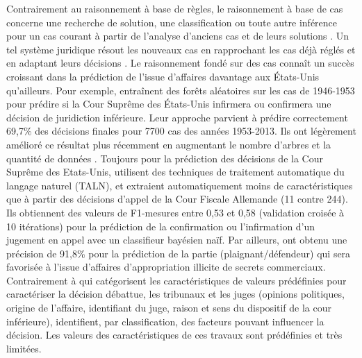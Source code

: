 Contrairement au raisonnement à base de règles, le raisonnement à base de cas concerne une recherche de solution, une classification ou toute autre inférence pour un cas courant à partir de l'analyse d'anciens cas et de leurs solutions \citep{moens2002case-basedreasoning}. Un tel système juridique résout les nouveaux cas en rapprochant les cas déjà réglés et en adaptant leurs décisions \citep{Berka2011rbr-cbr}. Le raisonnement fondé sur des cas connaît un succès croissant dans la prédiction de l'issue d'affaires davantage aux États-Unis qu'ailleurs. Pour exemple, \citet{katz2014predicting} entraînent des forêts aléatoires \citep{breiman2001randomforest} sur les cas de 1946-1953 pour prédire si la Cour Suprême des États-Unis infirmera ou confirmera une décision de juridiction inférieure. Leur approche parvient à prédire correctement 69,7\% des décisions finales pour 7700 cas des années 1953-2013. Ils ont légèrement amélioré ce résultat plus récemment en augmentant le nombre d'arbres et la quantité de données \citep{katz2017predictsupremecourt}. Toujours pour la prédiction des décisions de la Cour Suprême des Etats-Unis, \citet{waltl2017predictgermantaxlaw} utilisent des techniques de traitement automatique du langage naturel (TALN), et extraient automatiquement moins de caractéristiques que \citep{katz2014predicting}  à partir des décisions d'appel de la Cour Fiscale Allemande (11 contre 244). Ils obtiennent des valeurs de F1-mesures entre 0,53 et 0,58 (validation croisée à 10 itérations) pour la prédiction  de la confirmation ou l'infirmation d'un jugement en appel avec un classifieur bayésien naïf.  Par ailleurs, \cite{Ashley2009classifCases} ont obtenu une précision de 91,8\% pour la prédiction de la partie (plaignant/défendeur)  qui sera favorisée à l'issue d'affaires d'appropriation illicite de secrets commerciaux. Contrairement à \citep{katz2014predicting} qui catégorisent les caractéristiques de valeurs prédéfinies pour caractériser la décision débattue, les tribunaux et les juges (opinions politiques, origine de l'affaire, identifiant du juge, raison et sens du dispositif de la cour inférieure), \cite{Ashley2009classifCases} identifient, par classification, des facteurs pouvant influencer la décision. Les valeurs des caractéristiques de ces travaux sont prédéfinies et très limitées.%


